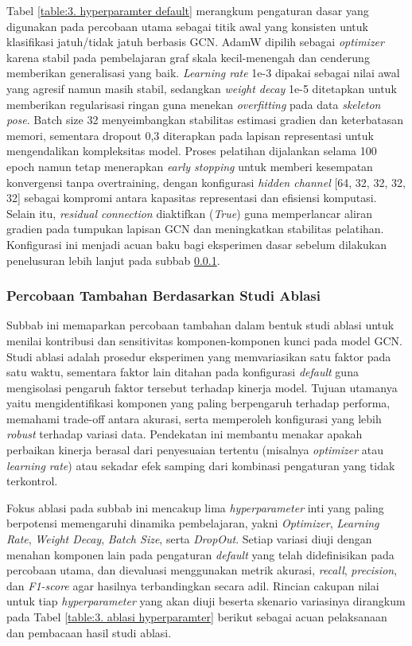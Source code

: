 Tabel \ref{table:3. hyperparamter default} merangkum pengaturan dasar yang digunakan pada percobaan utama sebagai titik awal yang konsisten untuk klasifikasi jatuh/tidak jatuh berbasis GCN. AdamW dipilih sebagai \textit{optimizer} karena stabil pada pembelajaran graf skala kecil-menengah dan cenderung memberikan generalisasi yang baik. \textit{Learning rate} 1e-3 dipakai sebagai nilai awal yang agresif namun masih stabil, sedangkan \textit{weight decay} 1e-5 ditetapkan untuk memberikan regularisasi ringan guna menekan \textit{overfitting} pada data \textit{skeleton pose}. Batch size 32 menyeimbangkan stabilitas estimasi gradien dan keterbatasan memori, sementara dropout 0{,}3 diterapkan pada lapisan representasi untuk mengendalikan kompleksitas model. Proses pelatihan dijalankan selama 100 epoch namun tetap menerapkan \textit{early stopping} untuk memberi kesempatan konvergensi tanpa overtraining, dengan konfigurasi \textit{hidden channel} [64, 32, 32, 32, 32] sebagai kompromi antara kapasitas representasi dan efisiensi komputasi. Selain itu, \textit{residual connection} diaktifkan (\textit{True}) guna memperlancar aliran gradien pada tumpukan lapisan GCN dan meningkatkan stabilitas pelatihan. Konfigurasi ini menjadi acuan baku bagi eksperimen dasar sebelum dilakukan penelusuran lebih lanjut pada subbab \ref{III.evaluasi ablasi}.

\subsubsection{Percobaan Tambahan Berdasarkan Studi Ablasi} \label{III.evaluasi ablasi}
Subbab ini memaparkan percobaan tambahan dalam bentuk studi ablasi untuk menilai kontribusi dan sensitivitas komponen-komponen kunci pada model GCN. Studi ablasi adalah prosedur eksperimen yang memvariasikan satu faktor pada satu waktu, sementara faktor lain ditahan pada konfigurasi \textit{default} guna mengisolasi pengaruh faktor tersebut terhadap kinerja model. Tujuan utamanya yaitu mengidentifikasi komponen yang paling berpengaruh terhadap performa, memahami trade-off antara akurasi, serta memperoleh konfigurasi yang lebih \textit{robust} terhadap variasi data. Pendekatan ini membantu menakar apakah perbaikan kinerja berasal dari penyesuaian tertentu (misalnya \textit{optimizer} atau \textit{learning rate}) atau sekadar efek samping dari kombinasi pengaturan yang tidak terkontrol.

Fokus ablasi pada subbab ini mencakup lima \textit{hyperparameter} inti yang paling berpotensi memengaruhi dinamika pembelajaran, yakni \textit{Optimizer}, \textit{Learning Rate}, \textit{Weight Decay}, \textit{Batch Size}, serta \textit{DropOut}. Setiap variasi diuji dengan menahan komponen lain pada pengaturan \textit{default} yang telah didefinisikan pada percobaan utama, dan dievaluasi menggunakan metrik akurasi, \textit{recall}, \textit{precision}, dan \textit{F1-score} agar hasilnya terbandingkan secara adil. Rincian cakupan nilai untuk tiap \textit{hyperparameter} yang akan diuji beserta skenario variasinya dirangkum pada Tabel \ref{table:3. ablasi hyperparamter} berikut sebagai acuan pelaksanaan dan pembacaan hasil studi ablasi.\par

